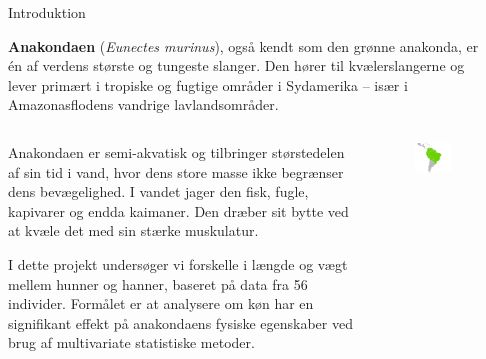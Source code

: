\documentclass[final]{beamer}
\newlength{\sepwidth}
\newlength{\colwidth}
\newcommand{\separatorcolumn}{\begin{column}{\sepwidth}\end{column}}
\begin{document}
\begin{frame}[t]
\begin{columns}[t]
\separatorcolumn

\begin{column}{\colwidth}

  \begin{block}{Introduktion}
  \justifying

	\textbf{Anakondaen} (\textit{Eunectes murinus}), også kendt som
	den grønne anakonda, er én af verdens største og
	tungeste slanger. Den hører til kvælerslangerne
	og lever primært i tropiske og fugtige områder i
	Sydamerika – især i Amazonasflodens vandrige
	lavlandsområder.
	\vspace{0.5em}
	
	
	\begin{columns}
	
  \begin{column}{0.40\textwidth}

  Anakondaen er semi-akvatisk og tilbringer
	størstedelen af sin tid i vand, hvor dens store
	masse ikke begrænser dens bevægelighed. I vandet
	jager den fisk, fugle, kapivarer og endda
	kaimaner. Den dræber sit bytte ved at kvæle det
	med sin stærke muskulatur.
	\vspace{1em}

	I dette projekt undersøger vi forskelle i længde
	og vægt mellem hunner og hanner, baseret på data
	fra 56 individer. Formålet er at analysere om
	køn har en signifikant effekt på anakondaens
	fysiske egenskaber ved brug af multivariate
	statistiske metoder.

  \end{column}
  
  \begin{column}{0.55\textwidth}
    \begin{figure}
      \centering
      \includegraphics[width=0.9\linewidth]{logos/habitat.png}
      \vspace{1.0em}
      

\end{figure}
\end{column}
\end{columns}
\end{block}
\end{column}
\end{columns}
\end{frame}
\end{document}
